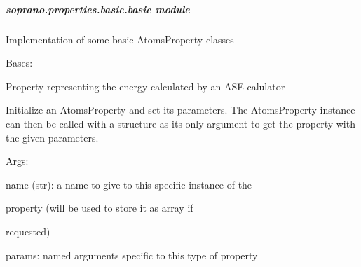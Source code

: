 \documentclass[letterpaper,10pt,english]{sphinxmanual}
\begin{document}
\subparagraph{soprano.properties.basic.basic module}
\label{doctree/soprano.properties.basic.basic::doc}\label{doctree/soprano.properties.basic.basic:module-soprano.properties.basic.basic}\label{doctree/soprano.properties.basic.basic:soprano-properties-basic-basic-module}
Implementation of some basic AtomsProperty classes

\begin{fulllineitems}
\label{doctree/soprano.properties.basic.basic:soprano.properties.basic.basic.CalcEnergy}
Bases: {\hyperref[doctree/soprano.properties.atomsproperty:soprano.properties.atomsproperty.AtomsProperty]{}}

Property representing the energy calculated by an ASE calulator

Initialize an AtomsProperty and set its parameters.
The AtomsProperty instance can then be called with a structure as its
only argument to get the property with the given parameters.

\begin{DUlineblock}{0em}
\item[] Args:
\item[]
\begin{DUlineblock}{\DUlineblockindent}
\item[] name (str): a name to give to this specific instance of the
\item[]
\begin{DUlineblock}{\DUlineblockindent}
\item[] property (will be used to store it as array if
\item[] requested)
\end{DUlineblock}
\item[] params: named arguments specific to this type of property
\end{DUlineblock}
\end{DUlineblock}

\begin{fulllineitems}
\label{doctree/soprano.properties.basic.basic:soprano.properties.basic.basic.CalcEnergy.default_name}
\end{fulllineitems}


\end{fulllineitems}
\end{document}
